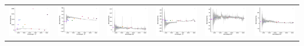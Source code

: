 \begin{center}
\begin{longtable}{l l l l l l }
    \includegraphics[width=0.3\linewidth, clip]{Figs/Figs-lamost/spec-55973-F5597306_sp14-196-SPLUS-n02s22-039680.pdf} & \includegraphics[width=0.3\linewidth, clip]{Figs/Figs-lamost/spec-55973-F5597306_sp15-212-SPLUS-n01s23-035079.pdf} & \includegraphics[width=0.3\linewidth, clip]{Figs/Figs-lamost/spec-56012-F5601204_sp14-071-SPLUS-n01s19-035613.pdf} & \includegraphics[width=0.3\linewidth, clip]{Figs/Figs-lamost/spec-56218-EG034047S021957B01_sp12-127-STRIPE82-0081-034915.pdf} & \includegraphics[width=0.3\linewidth, clip]{Figs/Figs-lamost/spec-56218-EG213945N020821B01_sp02-208-STRIPE82-0120-007072.pdf} & \includegraphics[width=0.3\linewidth, clip]{Figs/Figs-lamost/spec-56218-EG213945N020821B01_sp10-219-STRIPE82-0120-045064.pdf} \\

\end{longtable}
\end{center}
